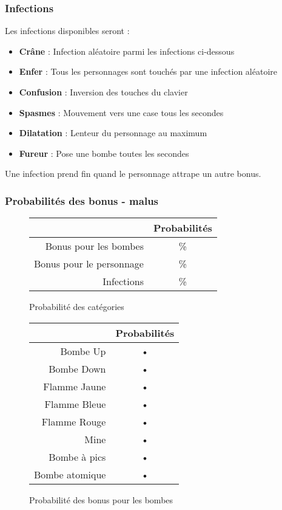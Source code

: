 \subsubsection{Infections}

Les infections disponibles seront :
\begin{itemize}
\item \textbf{Crâne} : Infection aléatoire parmi les infections ci-dessous
\item \textbf{Enfer} : Tous les personnages sont touchés par une infection aléatoire
\item \textbf{Confusion} : Inversion des touches du clavier
\item \textbf{Spasmes} : Mouvement vers une case tous les \nbSecondes secondes
\item \textbf{Dilatation} : Lenteur du personnage au maximum
\item \textbf{Fureur} : Pose une bombe toutes les \nbSecondes secondes
\end{itemize}

Une infection prend fin quand le personnage attrape un autre bonus.

\subsubsection{Probabilités des bonus - malus}

\begin{figure}[h]
	\begin{center}
		\begin{tabular}{|r|c|}
		\hline 
		& Probabilités \\ 
		\hline 
		Bonus pour les bombes & \% \\ 
		\hline 
		Bonus pour le personnage & \% \\ 
		\hline 
		Infections & \% \\ 
		\hline 
		\end{tabular} 
	\end{center}
	\caption{Probabilité des catégories}
\end{figure}

\begin{figure}[h]
	\begin{center}
		\begin{tabular}{|r|c|}
\hline 
& Probabilités \\ 
\hline 
Bombe Up & • \\ 
\hline 
Bombe Down & • \\ 
\hline 
Flamme Jaune & • \\ 
\hline 
Flamme Bleue & • \\ 
\hline 
Flamme Rouge & • \\ 
\hline 
Mine & • \\ 
\hline 
Bombe à pics & • \\ 
\hline 
Bombe atomique & • \\ 
\hline 
\end{tabular} 
	\end{center}
	\caption{Probabilité des bonus pour les bombes}
\end{figure}

